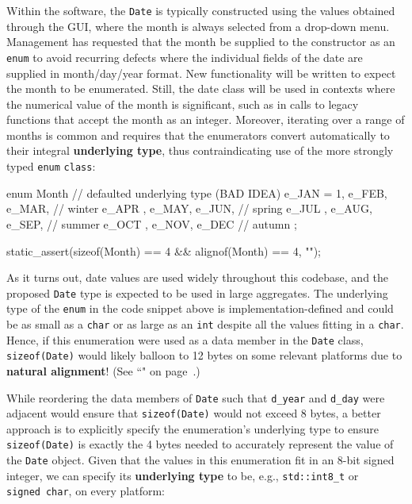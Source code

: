 \noindent Within the software, the \texttt{Date} is typically constructed using
the values obtained through the GUI, where the month is always selected
from a drop-down menu. Management has requested that the month be
supplied to the constructor as an \texttt{enum} to avoid recurring
defects where the individual fields of the date are supplied in
month/day/year format. New functionality will be written to expect the
month to be enumerated. Still, the date class will be used in contexts
where the numerical value of the month is significant, such as in calls
to legacy functions that accept the month as an integer. Moreover,
iterating over a range of months is common and requires that the
enumerators convert automatically to their integral \textbf{underlying
type}, thus contraindicating use of the more strongly typed
\texttt{enum} \texttt{class}:

\begin{emcppslisting}
enum Month  // defaulted underlying type (BAD IDEA)
{
    e_JAN = 1, e_FEB, e_MAR,    // winter
    e_APR    , e_MAY, e_JUN,    // spring
    e_JUL    , e_AUG, e_SEP,    // summer
    e_OCT    , e_NOV, e_DEC     // autumn
};

static_assert(sizeof(Month) == 4 && alignof(Month) == 4, "");
\end{emcppslisting}

\noindent As it turns out, date values are used widely throughout this codebase,
and the proposed \texttt{Date} type is expected to be used in large
aggregates. The underlying type of the \texttt{enum} in the code snippet
above is implementation-defined and could be as small as a \texttt{char}
or as large as an \texttt{int} despite all the values fitting in a
\texttt{char}. Hence, if this enumeration were used as a data member in
the \texttt{Date} class, \texttt{sizeof(Date)} would likely balloon to
12 bytes on some relevant platforms due to \textbf{natural alignment}!
(See ``" on page~\pageref{alignas}.)

While reordering the data members of \texttt{Date} such that \texttt{d\_year} and
\texttt{d\_day} were adjacent would ensure that \texttt{sizeof(Date)}
would not exceed 8 bytes, a better approach is to explicitly specify the
enumeration's underlying type to ensure \texttt{sizeof(Date)} is exactly
the 4 bytes needed to accurately represent the value of the
\texttt{Date} object. Given that the values in this enumeration fit in
an 8-bit signed integer, we can specify its \textbf{underlying type} to
be, e.g., \texttt{std::int8\_t} or \texttt{signed}~\texttt{char}, on
every platform:


